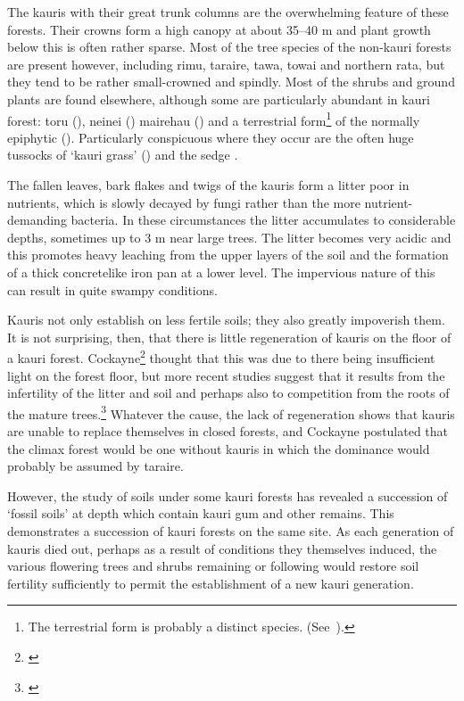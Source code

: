 The kauris with their great trunk columns are the overwhelming feature of these forests.
Their crowns form a high canopy at about 35--40 m and plant growth below this is often rather sparse.
Most of the tree species of the non-kauri forests are present however, including rimu, taraire, tawa, towai and northern rata, but they tend to be rather small-crowned and spindly.
Most of the shrubs and ground plants are found elsewhere, although some are particularly abundant in kauri forest: toru (), neinei () mairehau () and a terrestrial form\footnote{The terrestrial form is probably a distinct species. (See~\cite{eagle1982trees}).} of the normally epiphytic  ().
Particularly conspicuous where they occur are the often huge tussocks of `kauri grass' () and the sedge .

The fallen leaves, bark flakes and twigs of the kauris form a litter poor in nutrients, which is slowly decayed by fungi rather than the more nutrient-demanding bacteria.
In these circumstances the litter accumulates to considerable depths, sometimes up to 3 m near large trees.
The litter becomes very acidic and this promotes heavy leaching from the upper layers of the soil and the formation of a thick concretelike iron pan at a lower level.
The impervious nature of this can result in quite swampy conditions.

Kauris not only establish on less fertile soils; they also greatly impoverish them.
It is not surprising, then, that there is little regeneration of kauris on the floor of a kauri forest.
Cockayne\footnote{\cite{cockayne1928vegetation}} thought that this was due to there being insufficient light on the forest floor, but more recent studies suggest that it results from the infertility of the litter and soil and perhaps also to competition from the roots of the mature trees.\footnote{\cite{bieleski1959factors}}
Whatever the cause, the lack of regeneration shows that kauris are unable to replace themselves in closed forests, and Cockayne postulated that the climax forest would be one without kauris in which the dominance would probably be assumed by taraire.

However, the study of soils under some kauri forests has revealed a succession of `fossil soils' at depth which contain kauri gum and other remains.
This demonstrates a succession of kauri forests on the same site.
As each generation of kauris died out, perhaps as a result of conditions they themselves induced, the various flowering trees and shrubs remaining or following would restore soil fertility sufficiently to permit the establishment of a new kauri generation.

